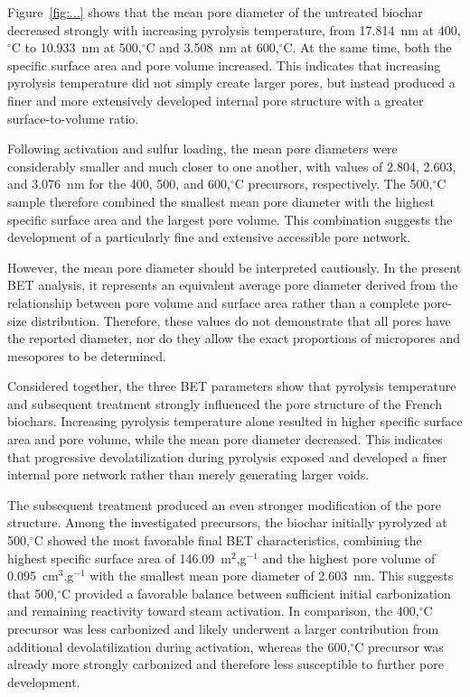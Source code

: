 Figure~\ref{fig:...} shows that the mean pore diameter of the untreated biochar decreased strongly with increasing pyrolysis temperature, from 17.814~nm at 400,$^\circ$C to 10.933~nm at 500,$^\circ$C and 3.508~nm at 600,$^\circ$C. At the same time, both the specific surface area and pore volume increased. This indicates that increasing pyrolysis temperature did not simply create larger pores, but instead produced a finer and more extensively developed internal pore structure with a greater surface-to-volume ratio.

Following activation and sulfur loading, the mean pore diameters were considerably smaller and much closer to one another, with values of 2.804, 2.603, and 3.076~nm for the 400, 500, and 600,$^\circ$C precursors, respectively. The 500,$^\circ$C sample therefore combined the smallest mean pore diameter with the highest specific surface area and the largest pore volume. This combination suggests the development of a particularly fine and extensive accessible pore network.

However, the mean pore diameter should be interpreted cautiously. In the present BET analysis, it represents an equivalent average pore diameter derived from the relationship between pore volume and surface area rather than a complete pore-size distribution. Therefore, these values do not demonstrate that all pores have the reported diameter, nor do they allow the exact proportions of micropores and mesopores to be determined.



Considered together, the three BET parameters show that pyrolysis temperature and subsequent treatment strongly influenced the pore structure of the French biochars. Increasing pyrolysis temperature alone resulted in higher specific surface area and pore volume, while the mean pore diameter decreased. This indicates that progressive devolatilization during pyrolysis exposed and developed a finer internal pore network rather than merely generating larger voids.

The subsequent treatment produced an even stronger modification of the pore structure. Among the investigated precursors, the biochar initially pyrolyzed at 500,$^\circ$C showed the most favorable final BET characteristics, combining the highest specific surface area of 146.09~m$^2$,g$^{-1}$ and the highest pore volume of 0.095~cm$^3$,g$^{-1}$ with the smallest mean pore diameter of 2.603~nm. This suggests that 500,$^\circ$C provided a favorable balance between sufficient initial carbonization and remaining reactivity toward steam activation. In comparison, the 400,$^\circ$C precursor was less carbonized and likely underwent a larger contribution from additional devolatilization during activation, whereas the 600,$^\circ$C precursor was already more strongly carbonized and therefore less susceptible to further pore development.

